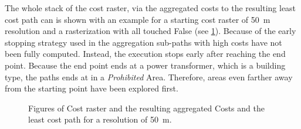 The whole stack of the cost raster, via the aggregated costs to the resulting least cost path can is shown with an example for a starting cost raster of 50~m resolution and a rasterization with all touched False (see \ref{fig:costs2path}).
Because of the early stopping strategy used in the aggregation sub-paths with high costs have not been fully computed.
Instead, the execution stops early after reaching the end point.
Because the end point ends at a power transformer, which is a building type, the paths ends at in a \textit{Prohibited} Area.
Therefore, areas even farther away from the starting point have been explored first.

\begin{figure}
	\centering
	
	\qquad
	\qquad

	\caption{Figures of Cost raster and the resulting aggregated Costs and the least cost path for a resolution of 50~m.}
	\label{fig:costs2path}
\end{figure}